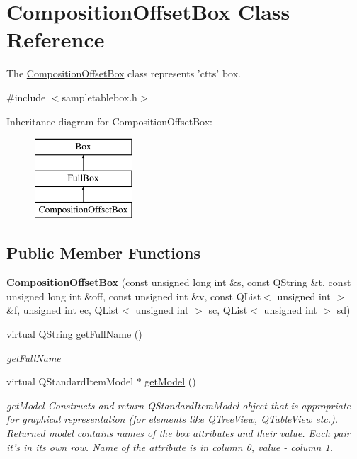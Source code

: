 \hypertarget{class_composition_offset_box}{\section{Composition\-Offset\-Box Class Reference}
\label{class_composition_offset_box}
}


The \hyperlink{class_composition_offset_box}{Composition\-Offset\-Box} class represents 'ctts' box.  




{\ttfamily \#include $<$sampletablebox.\-h$>$}

Inheritance diagram for Composition\-Offset\-Box\-:\begin{figure}[H]
\begin{center}
\leavevmode
\includegraphics[height=3.000000cm]{class_composition_offset_box}
\end{center}
\end{figure}
\subsection*{Public Member Functions}
\begin{DoxyCompactItemize}
\item 
\hypertarget{class_composition_offset_box_a4c0b13fc3e5957cd288cf73a6b247b6a}{{\bfseries Composition\-Offset\-Box} (const unsigned long int \&s, const Q\-String \&t, const unsigned long int \&off, const unsigned int \&v, const Q\-List$<$ unsigned int $>$ \&f, unsigned int ec, Q\-List$<$ unsigned int $>$ sc, Q\-List$<$ unsigned int $>$ sd)}\label{class_composition_offset_box_a4c0b13fc3e5957cd288cf73a6b247b6a}

\item 
virtual Q\-String \hyperlink{class_composition_offset_box_a6ed0d84212f70f61a021b39e1114c0fb}{get\-Full\-Name} ()
\begin{DoxyCompactList}\small\item\em get\-Full\-Name \end{DoxyCompactList}\item 
virtual Q\-Standard\-Item\-Model $\ast$ \hyperlink{class_composition_offset_box_aeeeab60183eae5c832e9e46a055ba4e3}{get\-Model} ()
\begin{DoxyCompactList}\small\item\em get\-Model Constructs and return Q\-Standard\-Item\-Model object that is appropriate for graphical representation (for elements like Q\-Tree\-View, Q\-Table\-View etc.). Returned model contains names of the box attributes and their value. Each pair it's in its own row. Name of the attribute is in column 0, value -\/ column 1. \end{DoxyCompactList}\end{DoxyCompactItemize}
